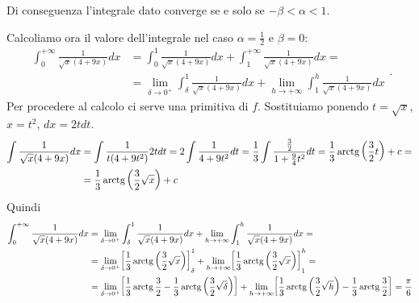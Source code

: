 \documentclass{article}
\begin{document}
\begin{enumerate}[label=\textbf{Esercizio 11.\arabic*.},itemindent=*]
Di conseguenza l'integrale dato converge se e solo se $-\beta<\alpha<1$.


Calcoliamo ora il valore dell'integrale nel caso $\alpha=\frac{1}{2}$ e $\beta=0$:
\[\begin{aligned}\int_0^{+\infty}\frac{1}{\sqrt{x}(4+9x)}dx&=\int_0^1\frac{1}{\sqrt{x}(4+9x)}dx+\int_1^{+\infty}\frac{1}{\sqrt{x}(4+9x)}dx=\\&=\lim_{\delta\to {0^+}}\int_\delta^1\frac{1}{\sqrt{x}(4+9x)}dx+\lim_{h\to {+\infty}}\int_1^{h}\frac{1}{\sqrt{x}(4+9x)}dx\end{aligned}.\]
Per procedere al calcolo ci serve una primitiva di $f$. Sostituiamo ponendo $t=\sqrt{x}$, $x=t^2$, $dx=2tdt$.
\[\begin{aligned}
    \int\frac{1}{\sqrt{x}(4+9x)}dx&=\int\frac{1}{t(4+9t^2)}2tdt=2\int\frac{1}{4+9t^2}dt=\frac{1}{3}\int\frac{\frac{3}{2}}{1+\frac{9}{4}t^2}dt=\frac{1}{3}\operatorname{arctg}\left(\frac{3}{2}t\right)+c=\\&=\frac{1}{3}\operatorname{arctg}\left(\frac{3}{2}\sqrt{x}\right)+c
\end{aligned}\]
Quindi 
\[\begin{aligned}
    \int_0^{+\infty}\frac{1}{\sqrt{x}(4+9x)}dx&=
    \lim_{\delta\to {0^+}}\int_\delta^1\frac{1}{\sqrt{x}(4+9x)}dx+\lim_{h\to {+\infty}}\int_1^{h}\frac{1}{\sqrt{x}(4+9x)}dx=\\&=
    \lim_{\delta\to {0^+}}\biggl[\frac{1}{3}\operatorname{arctg}\left( \frac{3}{2} \sqrt{x}\right)\biggr]_\delta^1+\lim_{h\to {+\infty}}\biggl[\frac{1}{3}\operatorname{arctg}\left( \frac{3}{2} \sqrt{x}\right)\biggr]_1^{h}=\\&=
    \lim_{\delta\to {0^+}}\biggl[\frac{1}{3}\operatorname{arctg}\frac{3}{2}-\frac{1}{3}\operatorname{arctg}\left( \frac{3}{2} \sqrt{\delta}\right)\biggr]+\lim_{h\to {+\infty}}\biggl[\frac{1}{3}\operatorname{arctg}\left( \frac{3}{2} \sqrt{h}\right)-\frac{1}{3}\operatorname{arctg}\frac{3}{2}\biggr]=\frac{\pi}{6}
\end{aligned}\]


\end{enumerate}
\end{document}
